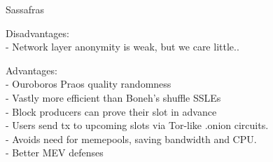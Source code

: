 \documentclass{beamer}
\begin{document}
\begin{frame}{Sassafras}

Disadvantages: \\
- Network layer anonymity is weak, but we care little.. \\

\bigskip\bigskip

Advantages: \\ \smallskip
- Ouroboros Praos quality randomness \\ \smallskip
- Vastly more efficient than Boneh's shuffle SSLEs \\ \smallskip
- Block producers can prove their slot in advance \\ \smallskip
- Users send tx to upcoming slots via Tor-like {.onion} circuits. \\ \smallskip
- Avoids need for memepools, saving bandwidth and CPU. \\ \smallskip
- Better MEV defenses \\ \smallskip

\end{frame}
\end{document}
